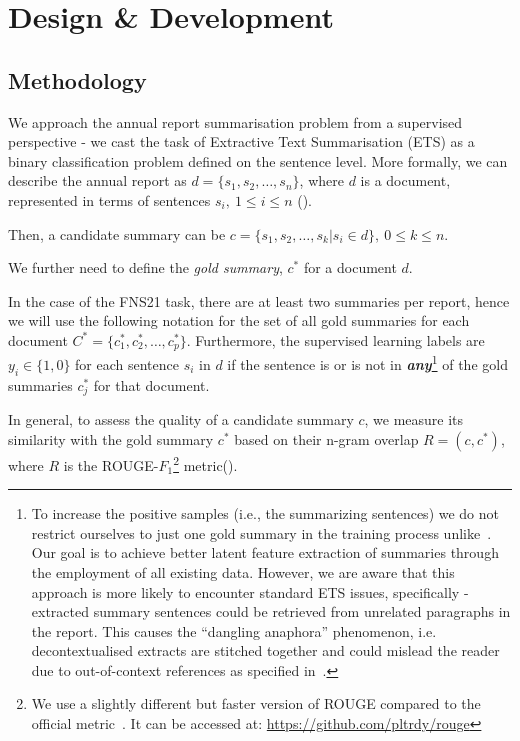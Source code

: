 \section{Design \& Development}\label{sec:design-and-development}

\subsection{Methodology}\label{subsec:methodology}
We approach the annual report summarisation problem from a supervised perspective - we cast the task of Extractive Text Summarisation (ETS) as a binary classification problem defined on the sentence level.
More formally, we can describe the annual report as $d=\{s_{1}, s_{2}, \dots, s_{n}\}$, where $d$ is a document, represented in terms of sentences $s_{i}, \  1 \leq i \leq n$ (\cite{liu2019finetuningbert}).

Then, a candidate summary can be $c=\{s_{1}, s_{2}, \dots, s_{k} | s_{i} \in d \}, \ 0 \leq k \leq n$.

We further need to define the \emph{gold summary}, $c^{*}$ for a document $d$.

In the case of the FNS21 task, there are at least two summaries per report, hence we will use the following notation for the set of all gold summaries for each document $C^{*} = \{c^{*}_{1}, c^{*}_{2}, \dots, c^{*}_{p}\}$.
Furthermore, the supervised learning labels are $y_{i} \in \{1,0\}$ for each sentence $s_{i}$ in $d$ if the sentence is or is not in \textbf{\emph{any}}\footnote{
    To increase the positive samples (i.e., the summarizing sentences) we do not restrict ourselves to just one gold summary in the training process unlike~\cite{orzhenovskii-2021-t5}.
    Our goal is to achieve better latent feature extraction of summaries through the employment of all existing data.
    However, we are aware that this approach is more likely to encounter standard ETS issues, specifically - extracted summary sentences could be retrieved from unrelated paragraphs in the report.
    This causes the \enquote{dangling anaphora} phenomenon, i.e. decontextualised extracts are stitched together and could mislead the reader due to out-of-context references as specified in~\cite{lin2009summarization}.
} of the gold summaries $c^{*}_{j}$ for that document.

In general, to assess the quality of a candidate summary $c$, we measure its similarity with the gold summary $c^{*}$ based on their n-gram overlap $R=(c, c^{*})$, where $R$ is the ROUGE-$F_{1}$\footnote{
    We use a slightly different but faster version of ROUGE compared to the official metric~\cite{lin2004rouge}.
    It can be accessed at: \url{https://github.com/pltrdy/rouge}
    } metric(\cite{lin2004rouge}).

